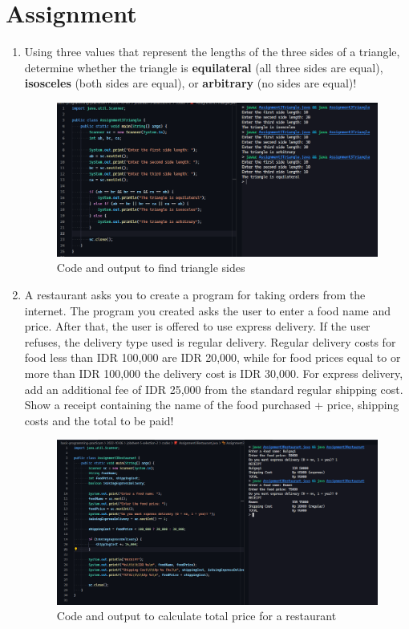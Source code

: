 \documentclass[12pt,titlepage]{article}
\begin{document}
\section{Assignment}
\begin{enumerate}
    \item {
        Using three values that represent the lengths of the three sides of a triangle, determine
        whether the triangle is \textbf{equilateral} (all three sides are equal), \textbf{isosceles} (both sides are
        equal), or \textbf{arbitrary} (no sides are equal)!

        \begin{figure}[h]
            \centering
            \includegraphics[width=\textwidth]{images/assignment3-triangle.png}
            \caption{Code and output to find triangle sides}
        \end{figure}
    }
    \pagebreak
    \item {
        A restaurant asks you to create a program for taking orders from the internet. The
        program you created asks the user to enter a food name and price. After that, the user is
        offered to use express delivery. If the user refuses, the delivery type used is regular
        delivery. Regular delivery costs for food less than IDR 100,000 are IDR 20,000, while for
        food prices equal to or more than IDR 100,000 the delivery cost is IDR 30,000. For express
        delivery, add an additional fee of IDR 25,000 from the standard regular shipping cost.
        Show a receipt containing the name of the food purchased + price, shipping costs and the
        total to be paid!

        \begin{figure}[h]
            \centering
            \includegraphics[width=\textwidth]{images/assignment3-restaurant.png}
            \caption{Code and output to calculate total price for a restaurant}
        \end{figure}
    }
\end{enumerate}
\end{document}
